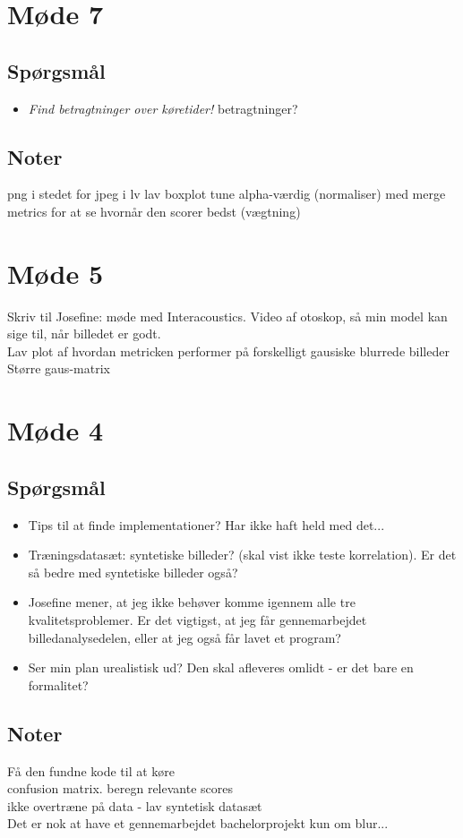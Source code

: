 \section*{Møde 7}
\subsection*{Spørgsmål}
\begin{itemize}
    \item \textit{Find betragtninger over køretider!} betragtninger?
\end{itemize}

\subsection*{Noter}
png i stedet for jpeg i lv
lav boxplot
tune alpha-værdig (normaliser) med merge metrics for at se hvornår den scorer bedst (vægtning)

\section*{Møde 5}
Skriv til Josefine: møde med Interacoustics. Video af otoskop, så min model kan sige til, når billedet er godt.\\
Lav plot af hvordan metricken performer på forskelligt gausiske blurrede billeder
Større gaus-matrix

\section*{Møde 4}
\subsection*{Spørgsmål}
\begin{itemize}
    \item Tips til at finde implementationer? Har ikke haft held med det...
    \item Træningsdatasæt: syntetiske billeder? (skal vist ikke teste korrelation). Er det så bedre med syntetiske billeder også?
    \item Josefine mener, at jeg ikke behøver komme igennem alle tre kvalitetsproblemer. Er det vigtigst, at jeg får gennemarbejdet billedanalysedelen, eller at jeg også får lavet et program?
    \item Ser min plan urealistisk ud? Den skal afleveres omlidt - er det bare en formalitet?
\end{itemize}
\subsection*{Noter}
Få den fundne kode til at køre\\
confusion matrix. beregn relevante scores\\
ikke overtræne på data - lav syntetisk datasæt\\
Det er nok at have et gennemarbejdet bachelorprojekt kun om blur...\\


